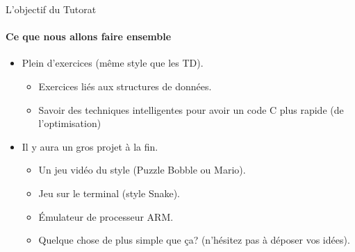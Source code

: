 \begin{frame}{L'objectif du Tutorat}
	\framesubtitle{Ce que nous allons faire ensemble}%
	\begin{itemize}
		\item Plein d'exercices (même style que les TD).
		\begin{itemize}
			\item Exercices liés aux structures de données.
			\item Savoir des techniques intelligentes pour avoir un code C plus rapide (de l'optimisation)
		\end{itemize}
		\item Il y aura un gros projet à la fin.
		\begin{itemize}
			\item Un jeu vidéo du style (Puzzle Bobble ou Mario).
			\item Jeu sur le terminal (style Snake).
			\item Émulateur de processeur ARM.
			\item Quelque chose de plus simple que ça? (n'hésitez pas à déposer vos idées).
		\end{itemize}
	\end{itemize}
\end{frame}

